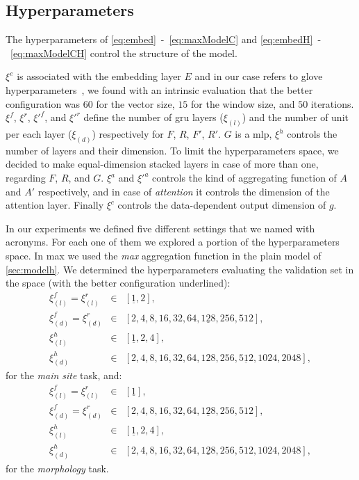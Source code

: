 \subsection{Hyperparameters}
The hyperparameters of \eqref{eq:embed}~-~\eqref{eq:maxModelC}
and \eqref{eq:embedH}~-~\eqref{eq:maxModelCH} control the structure of
the model.

$\xi^e$ is associated with the embedding layer $E$ and in our case
refers to \ac{glove} 
hyperparameters~\cite{pennington_glove:_2014}, we found with an
intrinsic evaluation that the better configuration was $60$ for the vector
size, $15$ for the window size, and $50$ iterations. $\xi^f$,
$\xi^r$, $\xi'^{f}$, and $\xi'^{r}$ define the number of
\ac{gru} layers ($\xi_{(l)}$) and the number of unit per each layer
($\xi_{(d)}$) respectively for $F$, $R$, $F'$, $R'$. 
$G$ is a \ac{mlp}, $\xi^h$ controls the number of
layers and their dimension. To limit the
hyperparameters space, we decided to
make equal-dimension stacked layers in case of more than one,
regarding $F$, $R$, and $G$. $\xi^a$ and $\xi'^a$ controls the
kind of aggregating function of $A$ and $A'$ respectively, and in case
of \emph{attention} 
it controls the dimension of the attention layer. Finally $\xi^c$ controls the
data-dependent output dimension of $g$.

In our experiments we defined five different settings that we named
with acronyms. For each one of them we explored a portion of the
hyperparameters space. In \ac{max} we used the \emph{max} aggregation
function 
in the plain model of \cref{sec:modelh}. We determined the
hyperparameters evaluating the validation set in the space (with the
better configuration underlined):
\begin{align*}
  \xi_{(l)}^f=\xi_{(l)}^r&\in&[\underline{1},2],\\
  \xi_{(d)}^f=\xi_{(d)}^r&\in&[2,4,8,16,32,64,\underline{128},256,512],\\
  \xi_{(l)}^h&\in&[\underline{1},2,4],\\
  \xi_{(d)}^h&\in&[2,4,8,16,32,64,128,256,\underline{512},1024,2048],
\end{align*}
for the \emph{main site} task, and:
\begin{align*}
  \xi_{(l)}^f=\xi_{(l)}^r&\in&[\underline{1}],\\
  \xi_{(d)}^f=\xi_{(d)}^r&\in&[2,4,8,16,32,64,\underline{128},256,512],\\
  \xi_{(l)}^h&\in&[\underline{1},2,4],\\
  \xi_{(d)}^h&\in&[2,4,8,16,32,64,\underline{128},256,512,1024,2048],
\end{align*}
for the \emph{morphology} task.


